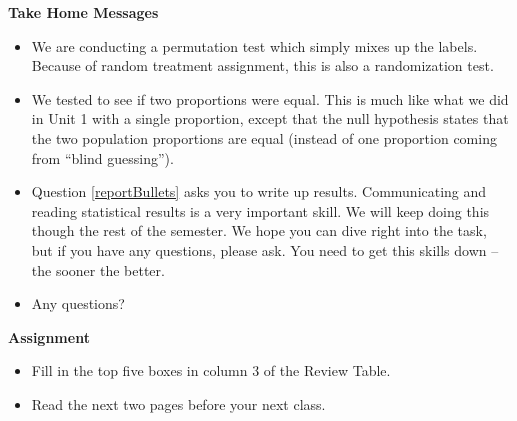 \begin{center}
  {\bf Take Home Messages}
\end{center}
  \begin{itemize}
  \item We are conducting a permutation test which simply mixes up the
    labels.  Because of random treatment assignment, this is also a
    randomization test. 
  \item We tested to see if  two proportions were
    equal. This is much like what we did in Unit 1 with a single
    proportion, except that the null hypothesis states that the two
    population proportions are equal (instead of one proportion coming
    from ``blind guessing'').
  \item Question \ref{reportBullets} asks you to write up results.
    Communicating 
    and reading statistical results is a very important skill.  We
    will keep doing this though the rest of the semester.  We hope you
    can dive right into the task, but if you have any questions,
    please ask.  You need to get this skills down -- the sooner the
    better. 
 \item 
 Any questions?\vfill
  \end{itemize}





\noindent
{\bf Assignment} \vspace{-.2in}
\begin{itemize}
  \item Fill in the top five boxes in column 3 of the Review Table.
  \item Read the next two pages before your next class.
\end{itemize}


